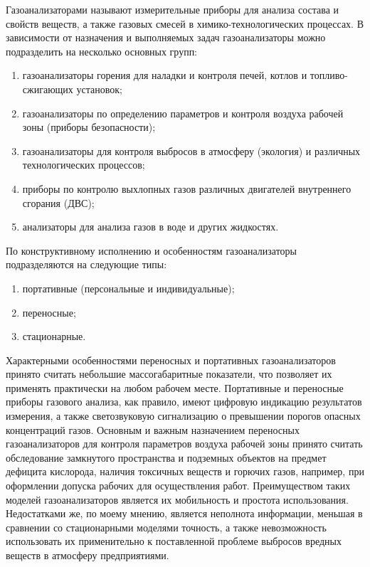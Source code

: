 \documentclass[14pt, a4paper]{extreport}
\begin{document}
	Газоанализаторами называют измерительные приборы для анализа состава и свойств веществ, а также газовых смесей в химико-технологических процессах. В зависимости от назначения и выполняемых задач газоанализаторы можно подразделить на несколько основных групп:
	\begin{enumerate}[label={\arabic*)}]
		\item газоанализаторы горения для наладки и контроля печей, котлов и топливо-сжигающих установок;
		\item газоанализаторы по определению параметров и контроля воздуха рабочей зоны (приборы безопасности);
		\item газоанализаторы для контроля выбросов в атмосферу (экология) и различных технологических процессов;
		\item приборы по контролю выхлопных газов различных двигателей внутреннего сгорания (ДВС);
		\item анализаторы для анализа газов в воде и других жидкостях.
	\end{enumerate}	
		
	По конструктивному исполнению и особенностям газоанализаторы подразделяются на следующие типы:
	\begin{enumerate}[label={\arabic*)}]
		\item портативные (персональные и индивидуальные);
		\item переносные;
		\item стационарные.
	\end{enumerate}	

	Характерными особенностями переносных и портативных газоанализаторов принято считать небольшие массогабаритные показатели, что позволяет их применять практически на любом рабочем месте. Портативные и переносные приборы газового анализа, как правило, имеют цифровую индикацию результатов измерения, а также светозвуковую сигнализацию о превышении порогов опасных концентраций газов. Основным и важным назначением переносных газоанализаторов для контроля параметров воздуха рабочей зоны принято считать обследование замкнутого пространства и подземных объектов на предмет дефицита кислорода, наличия токсичных веществ и горючих газов, например, при оформлении допуска рабочих для осуществления работ. Преимуществом таких моделей газоанализаторов является их мобильность и простота использования. Недостатками же, по моему мнению, является неполнота информации, меньшая в сравнении со стационарными моделями точность, а также невозможность использовать их применительно к поставленной проблеме выбросов вредных веществ в атмосферу предприятиями.
	
\end{document}
